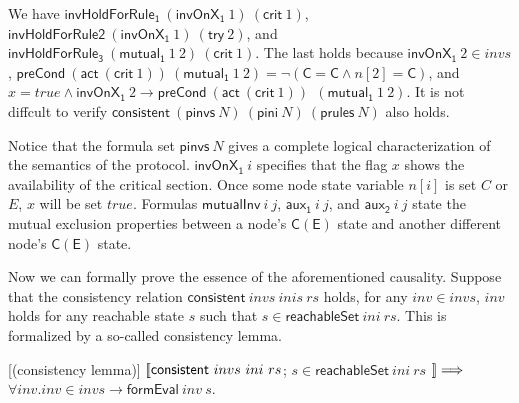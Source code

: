 \documentclass{llncs}
\begin{document}
We have  $\mathsf{invHoldForRule_1 }~(\mathsf{invOnX_1} ~1)~
(\mathsf{crit}~1)$, $\mathsf{invHoldForRule2 }~(\mathsf{invOnX_1}
~1)~ (\mathsf{try}~2)$,
 and $\mathsf{invHoldForRule_3 }~(\mathsf{mutual_1} ~1~2)~ (\mathsf{crit}~1)$.
 The last holds because
 $\mathsf{invOnX_1} ~2 \in invs$, $\mathsf{preCond}~(\mathsf{act}~(\mathsf{crit}~1))~
 (\mathsf{mutual_1} ~1~2)=\neg (\mathsf{C}=\mathsf{C}\wedge n[2]=\mathsf{C})$,
 and $ x=true \wedge \mathsf{invOnX_1}~2 \longrightarrow \mathsf{preCond}~
 (\mathsf{act}~(\mathsf{crit}~1))~~(\mathsf{mutual_1}
 ~1~2)$. It is not diffcult to verify
$\mathsf{consistent}~ (\mathsf{pinvs}~ N) ~(\mathsf{pini}~N)~
(\mathsf{prules}~N)$ also holds.

Notice that the formula set $\mathsf{pinvs}~ N$ gives a complete
logical characterization of the semantics of the protocol.
$\mathsf{invOnX_1} ~i$ specifies that the flag $x$ shows the
availability of the critical section. Once some node state variable
$n[i]$ is set $C$ or $E$, $x$ will be set $true$. Formulas
$\mathsf{mutualInv}~ i ~j$, $\mathsf{aux_1} ~i~j$, and
$\mathsf{aux_2} ~i~j$ state the mutual exclusion properties between
a node's $\mathsf{C}(\mathsf{E})$ state and another different node's
$\mathsf{C}(\mathsf{E})$ state.

Now we can formally prove the essence of the aforementioned
causality. Suppose that the consistency relation
$\mathsf{consistent}~ invs ~inis~ rs$ holds, for any $inv \in invs$,
$inv$ holds for any reachable state $s$ such that $s  \in
\mathsf{reachableSet}~ ini~ rs$. This is formalized by a so-called
consistency lemma.

\begin{lemma}\label{consistentLemma}[(consistency lemma)]
  $\emph{$\mathopen{\lbrack\mkern-3mu\lbrack}$} \mathsf{consistent}~ invs ~ini~ rs$; $s  \in \mathsf{reachableSet}~ ini~ rs$
  $\emph{$\mathclose{\rbrack\mkern-3mu\rbrack}$}\Longrightarrow$ $\forall inv. inv \in invs \longrightarrow
\mathsf{formEval}~ inv ~s$.
\end{lemma}
\end{document}
